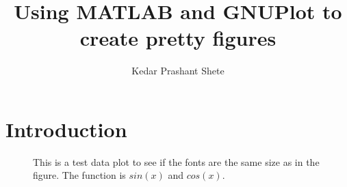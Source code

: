 \documentclass[12pt]{article}
\title{Using MATLAB and GNUPlot to create pretty figures}
\author{Kedar Prashant Shete}
\begin{document}
\maketitle

\section{Introduction}	
\begin{figure}[h]
	\centering
	
	\caption{ This is a test data plot to see if the fonts are the same size as in the figure. The function is $sin(x)$ and $cos(x)$.}
\end{figure}
\end{document}
